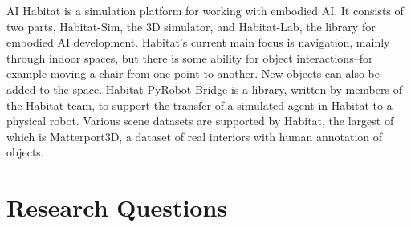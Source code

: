 AI Habitat is a simulation platform for working with embodied AI\cite{habitat19iccv}. It consists of two parts, Habitat-Sim, the 3D simulator, and Habitat-Lab, the library for embodied AI development. Habitat's current main focus is navigation, mainly through indoor spaces, but there is some ability for object interactions--for example moving a chair from one point to another. New objects can also be added to the space. Habitat-PyRobot Bridge is a library, written by members of the Habitat team, to support the transfer of a simulated agent in Habitat to a physical robot\cite{Kadian_2020}. Various scene datasets are supported by Habitat, the largest of which is Matterport3D, a dataset of real interiors with human annotation of objects\cite{matterport}.



\section{Research Questions}





